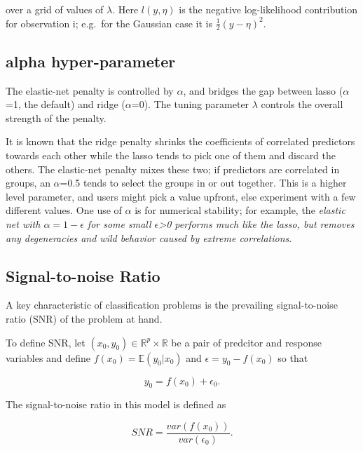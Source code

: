 \documentclass[
]{book}
\begin{document}
over a grid of values of \(\lambda\).
Here \(l(y,\eta)\) is the negative log-likelihood contribution for observation i;
e.g.~for the Gaussian case it is \(\frac{1}{2}(y-\eta)^2\).

\hypertarget{alpha-hyper-parameter}{%
\subsection*{\texorpdfstring{\textbf{alpha} hyper-parameter}{alpha hyper-parameter}}\label{alpha-hyper-parameter}}

The elastic-net penalty is controlled by \(\alpha\), and bridges the gap between
lasso (\(\alpha\)=1, the default) and ridge (\(\alpha\)=0).
The tuning parameter \(\lambda\) controls the overall strength of the penalty.

It is known that the ridge penalty shrinks the coefficients of correlated predictors
towards each other while the lasso tends to pick one of them and discard the others.
The elastic-net penalty mixes these two; if predictors are correlated in groups,
an \(\alpha\)=0.5 tends to select the groups in or out together.
This is a higher level parameter, and users might pick a value upfront,
else experiment with a few different values. One use of \(\alpha\) is for numerical stability;
for example, the \emph{elastic net with \(\alpha = 1 - \epsilon\) for some small \(\epsilon\)\textgreater0
performs much like the lasso, but removes any degeneracies and wild behavior caused
by extreme correlations}.

\hypertarget{signal-to-noise-ratio}{%
\subsection*{Signal-to-noise Ratio}\label{signal-to-noise-ratio}}

A key characteristic of classification problems is the
prevailing signal-to-noise ratio (SNR) of the problem at hand.

To define SNR, let \((x_0, y_0) \in \mathbb{R}^p \times \mathbb{R}\)
be a pair of predcitor and response variables and define
\(f(x_0) = \mathbb{E}(y_0|x_0)\) and \(\epsilon = y_0 - f(x_0)\) so that

\[y_0 = f(x_0) + \epsilon_0.\]

The signal-to-noise ratio in this model is defined as

\[SNR=\frac{var(f(x_0))}{var(\epsilon_0)}.\]
\end{document}
